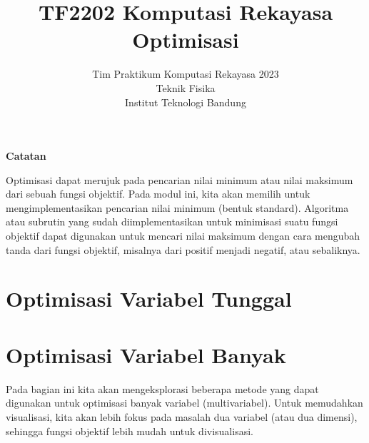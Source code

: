 



\title{%
{\small TF2202 Komputasi Rekayasa}\\
Optimisasi
}
\author{Tim Praktikum Komputasi Rekayasa 2023\\
Teknik Fisika\\
Institut Teknologi Bandung}
\date{}
\maketitle

\textbf{Catatan}

Optimisasi dapat merujuk pada pencarian nilai minimum atau nilai maksimum
dari sebuah fungsi objektif.
Pada modul ini, kita akan memilih untuk mengimplementasikan
pencarian nilai minimum (bentuk standard).
Algoritma atau subrutin yang sudah diimplementasikan
untuk minimisasi suatu fungsi objektif dapat digunakan untuk mencari nilai maksimum
dengan cara mengubah tanda dari fungsi objektif, misalnya dari positif menjadi negatif,
atau sebaliknya.


\section{Optimisasi Variabel Tunggal}
%





\section{Optimisasi Variabel Banyak}
Pada bagian ini kita akan mengeksplorasi beberapa metode yang dapat
digunakan untuk optimisasi banyak variabel (multivariabel). Untuk
memudahkan visualisasi, kita akan lebih fokus pada masalah dua variabel
(atau dua dimensi), sehingga fungsi objektif lebih mudah untuk divisualisasi.








